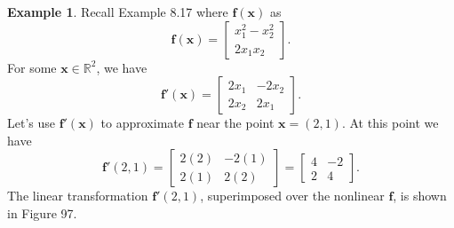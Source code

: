 \documentclass{article}
\newcommand{\R}{\mathbb{R}}
\newcommand{\x}{\mathbf{x}}
\newcommand{\f}{\mathbf{f}}
\theoremstyle{definition}
\newtheorem{example}{Example}[section]
\begin{document}
\begin{example}
Recall Example 8.17 where $ \f(\x) $ as $$ \f(\x)=\begin{bmatrix}
	x_1^2-x_2^2\\
	2x_1x_2
\end{bmatrix}. $$
For some $ \x\in \R^2 $, we have 
$$ \f'(\x) = \begin{bmatrix}
	2x_1 &-2x_2\\
	2x_2 & 2x_1
\end{bmatrix}.$$ Let's use $ \f'(\x) $ to approximate $ \f $ near the point $ \x=(2,1) $. At this point we have $$ \f'(2,1) = \begin{bmatrix}
2(2)&-2(1)\\2(1) & 2(2)
\end{bmatrix} = \begin{bmatrix}
4&-2\\2 & 4
\end{bmatrix}.$$
The linear transformation $ \f'(2,1) $, superimposed over the nonlinear $ \f $, is shown in Figure 97. 


\end{example}
\end{document}
